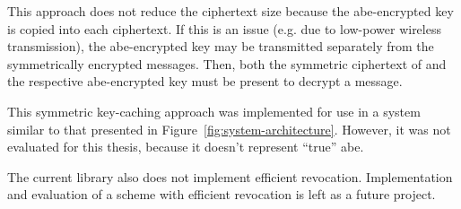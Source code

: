 This approach does not reduce the ciphertext size because the \acrshort{abe}-encrypted key is copied into each ciphertext.
If this is an issue (e.g. due to low-power wireless transmission), the \acrshort{abe}-encrypted key may be transmitted separately from the symmetrically encrypted messages.
Then, both the symmetric ciphertext of and the respective \acrshort{abe}-encrypted key must be present to decrypt a message.

This symmetric key-caching approach was implemented for use in a system similar to that presented in Figure~\ref{fig:system-architecture}.
However, it was not evaluated for this thesis, because it doesn't represent ``true'' \acrlong{abe}.

The current library also does not implement efficient revocation. 
Implementation and evaluation of a scheme with efficient revocation is left as a future project.
